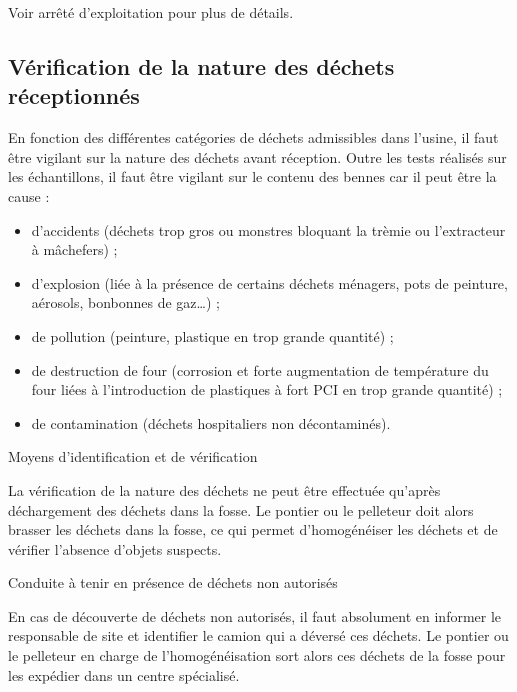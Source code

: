 Voir arrêté d’exploitation pour plus de détails.

\subsection{Vérification de la nature des déchets réceptionnés}

En fonction des différentes catégories de déchets admissibles dans l’usine, il faut être vigilant sur la nature des déchets avant réception. Outre les tests réalisés sur les échantillons, il faut être vigilant sur le contenu des bennes car il peut être la cause :


\begin{itemize}


\item d’accidents (déchets trop gros ou monstres bloquant la trèmie ou l’extracteur à mâchefers) ;
\item d’explosion (liée à la présence de certains déchets ménagers, pots de peinture, aérosols, bonbonnes de gaz…) ;
\item de pollution (peinture, plastique en trop grande quantité) ;
\item de destruction de four (corrosion et forte augmentation de température du four liées à l’introduction de plastiques à fort PCI en trop grande quantité) ;
\item de contamination (déchets hospitaliers non décontaminés).


\end{itemize}


\vspace{0.3cm}

Moyens d’identification et de vérification
\vspace{0.3cm}

La vérification de la nature des déchets ne peut être effectuée qu’après déchargement des déchets dans la fosse. Le pontier ou le pelleteur doit alors brasser les déchets dans la fosse, ce qui permet d’homogénéiser les déchets et de vérifier l’absence d’objets suspects.
\vspace{0.3cm}

\vspace{0.3cm}

Conduite à tenir en présence de déchets non autorisés
\vspace{0.3cm}

En cas de découverte de déchets non autorisés, il faut absolument en informer le responsable de site et identifier le camion qui a déversé ces déchets. Le pontier ou le pelleteur en charge de  l’homogénéisation sort alors ces déchets de la fosse pour les expédier dans un centre spécialisé.


